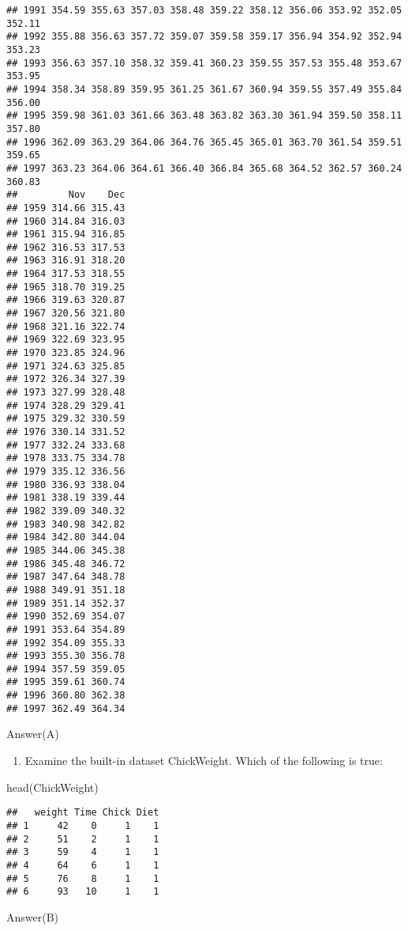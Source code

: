 \documentclass[
]{article}
\newenvironment{Shaded}{\begin{snugshade}}{\end{snugshade}}
\newcommand{\FunctionTok}[1]{\textcolor[rgb]{0.00,0.00,0.00}{#1}}
\newcommand{\NormalTok}[1]{#1}
\providecommand{\tightlist}{%
  \setlength{\itemsep}{0pt}\setlength{\parskip}{0pt}}
\begin{document}
\begin{verbatim}
## 1991 354.59 355.63 357.03 358.48 359.22 358.12 356.06 353.92 352.05 352.11
## 1992 355.88 356.63 357.72 359.07 359.58 359.17 356.94 354.92 352.94 353.23
## 1993 356.63 357.10 358.32 359.41 360.23 359.55 357.53 355.48 353.67 353.95
## 1994 358.34 358.89 359.95 361.25 361.67 360.94 359.55 357.49 355.84 356.00
## 1995 359.98 361.03 361.66 363.48 363.82 363.30 361.94 359.50 358.11 357.80
## 1996 362.09 363.29 364.06 364.76 365.45 365.01 363.70 361.54 359.51 359.65
## 1997 363.23 364.06 364.61 366.40 366.84 365.68 364.52 362.57 360.24 360.83
##         Nov    Dec
## 1959 314.66 315.43
## 1960 314.84 316.03
## 1961 315.94 316.85
## 1962 316.53 317.53
## 1963 316.91 318.20
## 1964 317.53 318.55
## 1965 318.70 319.25
## 1966 319.63 320.87
## 1967 320.56 321.80
## 1968 321.16 322.74
## 1969 322.69 323.95
## 1970 323.85 324.96
## 1971 324.63 325.85
## 1972 326.34 327.39
## 1973 327.99 328.48
## 1974 328.29 329.41
## 1975 329.32 330.59
## 1976 330.14 331.52
## 1977 332.24 333.68
## 1978 333.75 334.78
## 1979 335.12 336.56
## 1980 336.93 338.04
## 1981 338.19 339.44
## 1982 339.09 340.32
## 1983 340.98 342.82
## 1984 342.80 344.04
## 1985 344.06 345.38
## 1986 345.48 346.72
## 1987 347.64 348.78
## 1988 349.91 351.18
## 1989 351.14 352.37
## 1990 352.69 354.07
## 1991 353.64 354.89
## 1992 354.09 355.33
## 1993 355.30 356.78
## 1994 357.59 359.05
## 1995 359.61 360.74
## 1996 360.80 362.38
## 1997 362.49 364.34
\end{verbatim}

Answer(A)

\begin{enumerate}
\def\labelenumi{\arabic{enumi}.}
\setcounter{enumi}{1}
\tightlist
\item
  Examine the built-in dataset ChickWeight. Which of the following is
  true:
\end{enumerate}

\begin{Shaded}
\begin{Highlighting}[]
\FunctionTok{head}\NormalTok{(ChickWeight)}
\end{Highlighting}
\end{Shaded}

\begin{verbatim}
##   weight Time Chick Diet
## 1     42    0     1    1
## 2     51    2     1    1
## 3     59    4     1    1
## 4     64    6     1    1
## 5     76    8     1    1
## 6     93   10     1    1
\end{verbatim}

Answer(B)
\end{document}
